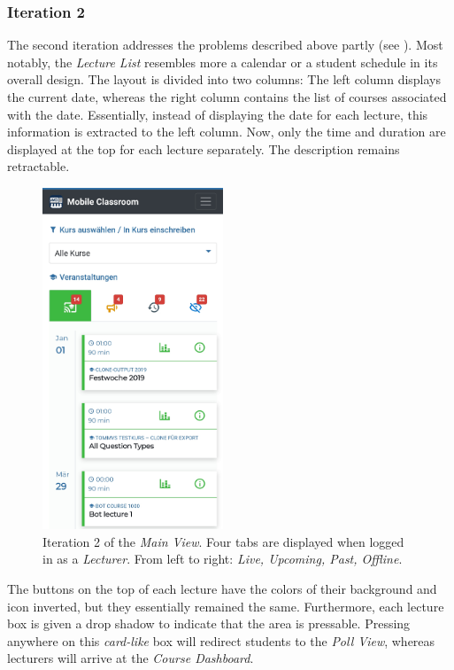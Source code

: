 \subsubsection{Iteration 2}
The second iteration addresses the problems described above partly (see ). Most notably, the \emph{Lecture List} resembles more a calendar or a student schedule in its overall design. The layout is divided into two columns: The left column displays the current date, whereas the right column contains the list of courses associated with the date. Essentially, instead of displaying the date for each lecture, this information is extracted to the left column. Now, only the time and duration are displayed at the top for each lecture separately. The description remains retractable.
\begin{figure}
	\vspace*{-0.5cm}
	\begin{center}
		\includegraphics[width=0.48\textwidth]{screenshots/redesign/main_view_iteration_2.jpg}
	\end{center}
	\captionsetup{format=plain}
	\caption{Iteration 2 of the \emph{Main View}. Four tabs are displayed when logged in as a \emph{Lecturer}. From left to right: \emph{Live, Upcoming, Past, Offline}.}
	\label{fig:main_view:_it2}
	\vspace*{-1.5cm}
\end{figure}
The buttons on the top of each lecture have the colors of their background and icon inverted, but they essentially remained the same.
Furthermore, each lecture box is given a drop shadow to indicate that the area is pressable. Pressing anywhere on this \emph{card-like} box will redirect students to the \emph{Poll View}, whereas lecturers will arrive at the \emph{Course Dashboard}.

